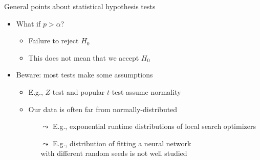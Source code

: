 \begin{frame}[c]{General points about statistical hypothesis tests}

\begin{itemize}
\item What if $p > \alpha$?
\begin{itemize}
\item \alert{Failure to reject $H_0$}
\item \alert{This does not mean that we accept $H_0$}
\end{itemize}


\pause
\bigskip
\item Beware: most tests make some assumptions
\begin{itemize}
\item E.g., $Z$-test and popular $t$-test assume \alert{normality}
\item Our data is often far from normally-distributed
\begin{itemize}
\item[$\leadsto$] E.g., exponential runtime distributions of local search optimizers
\item[$\leadsto$] E.g., distribution of fitting a neural network\\ with different random seeds is not well studied
\end{itemize}
\end{itemize}

\end{itemize}

\end{frame}
